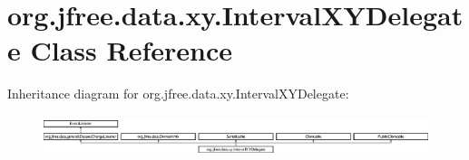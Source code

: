 \hypertarget{classorg_1_1jfree_1_1data_1_1xy_1_1_interval_x_y_delegate}{}\section{org.\+jfree.\+data.\+xy.\+Interval\+X\+Y\+Delegate Class Reference}
\label{classorg_1_1jfree_1_1data_1_1xy_1_1_interval_x_y_delegate}
Inheritance diagram for org.\+jfree.\+data.\+xy.\+Interval\+X\+Y\+Delegate\+:\begin{figure}[H]
\begin{center}
\leavevmode
\includegraphics[height=1.204301cm]{classorg_1_1jfree_1_1data_1_1xy_1_1_interval_x_y_delegate}
\end{center}
\end{figure}
